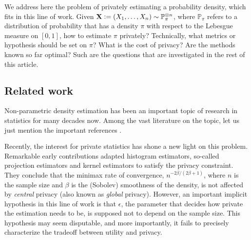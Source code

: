 \documentclass[10pt]{article} %
\newcommand{\Prob}[0]{\mathbb{P}}
\newcommand{\eqdef}{\vcentcolon=}
\newcommand\vect[1]{\mathbf{#1}}
\newcommand\p[1]{\left( {#1}\right)}
\newcommand\RG[1]{\textcolor{red}{#1}}
\newcommand\AG[1]{\textcolor{magenta}{#1}}
\newcommand\B[1]{{#1}}
\begin{document}
We address here the problem of privately estimating a probability density, which fits in this line of work. Given $\vect{X} \eqdef \p{X_1, \dots, X_n} \sim \Prob_\pi^{\otimes n}$, where $\Prob_\pi$ refers to a distribution of probability that 
has a density $\pi$ 
with respect to the Lebesgue measure on $[0, 1]$, how to estimate $\pi$ privately? Technically, what metrics or hypothesis should be set on $\pi$? What is the cost of privacy? Are the methods known so far optimal? Such are the questions that are investigated in the rest of this article.

\subsection{Related work}

Non-parametric density estimation has been an important topic of research in statistics for many decades now. Among the vast literature on the topic, let us just mention the important references \citet{gyorfi2002distribution,tsybakov2003introduction}. 

Recently, the interest for private statistics has shone a new light on this problem. Remarkable early contributions \citep{wasserman2010statistical,hall2013differential} adapted histogram estimators, so-called projection estimators and kernel estimators to satisfy the privacy constraint. They conclude that the minimax rate of convergence, $n^{- 2 \beta/(2 \beta + 1)}$, where $n$ is the sample size and $\beta$ is the (Sobolev) smoothness of the density, is not affected by \emph{\B{central}} privacy (also known as {\em global} privacy).
However, an important implicit hypothesis in this line of work is that $\epsilon$, the parameter that decides how private the estimation needs to be, is supposed not to depend on the sample size. This hypothesis may seem disputable, and more importantly, it fails to precisely characterize the tradeoff between utility and privacy. 
\end{document}
